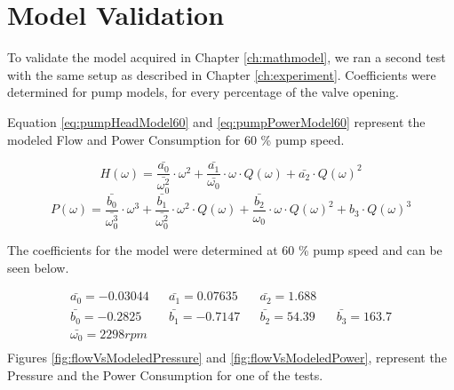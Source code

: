 \chapter{Model Validation}\label{ch:modValPerf}

To validate the model acquired in Chapter \ref{ch:mathmodel}, we ran a second test with the 
same setup as described in Chapter \ref{ch:experiment}. Coefficients were determined for pump models,
for every percentage of the valve opening.

Equation \ref{eq:pumpHeadModel60} and \ref{eq:pumpPowerModel60} represent the modeled Flow and Power 
Consumption for 60 \% pump speed.

\begin{equation}
	H(\omega) = \frac{\bar{a_0}}{\bar{\omega_0^2}} \cdot \omega^2 + \frac{\bar{a_1}}{\bar{\omega_0}} \cdot \omega \cdot Q(\omega) + \bar{a_2} \cdot Q(\omega)^2
	\label{eq:pumpHeadModel60}
\end{equation}
\begin{equation}
	P(\omega) = \frac{\bar{b_0}}{\bar{\omega_0^3}} \cdot \omega^3 + \frac{\bar{b_1}}{\bar{\omega_0^2}} \cdot \omega^2 \cdot Q(\omega) + \frac{\bar{b_2}}{\omega_0} \cdot \omega \cdot Q(\omega)^2 + b_3 \cdot Q(\omega)^3
	\label{eq:pumpPowerModel60}
\end{equation}

The coefficients for the model were determined at 60 \% pump speed and can be seen below.

\begin{align*}
	\bar{a_0} = -0.03044 && \bar{a_1} = 0.07635  && \bar{a_2} = 1.688  \\
	\bar{b_0} = -0.2825 && \bar{b_1} = -0.7147 && \bar{b_2} = 54.39 && \bar{b_3} = 163.7 \\
	\bar{\omega_0} = 2298 rpm \\
\end{align*}
\newpage
Figures \ref{fig:flowVsModeledPressure} and \ref{fig:flowVsModeledPower}, represent the Pressure and 
the Power Consumption for one of the tests.

